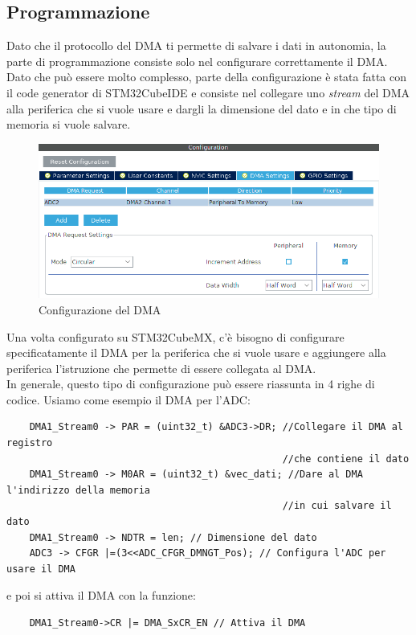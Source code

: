 \subsection{Programmazione}
Dato che il protocollo del DMA ti permette di salvare i dati in autonomia, la parte di programmazione consiste solo nel configurare correttamente il DMA.\\



Dato che può essere molto complesso, parte della configurazione è stata fatta con il code generator di STM32CubeIDE e consiste nel collegare uno \textit{stream} del DMA alla periferica che si vuole usare e dargli la dimensione del dato e in che tipo di memoria si vuole salvare.\\

\begin{figure}
    \centering
    \includegraphics[width=\linewidth]{microcontrollore/assets/dma_configuration.png}
    \caption{Configurazione del DMA}
    \label{fig:DMA}
\end{figure}

Una volta configurato su STM32CubeMX, c'è bisogno di configurare specificatamente il DMA per la periferica che si vuole usare e aggiungere alla periferica l'istruzione che permette di essere collegata al DMA.\\

In generale, questo tipo di configurazione può essere riassunta in 4 righe di codice. Usiamo come esempio il DMA per l'ADC:

\begin{verbatim}
    DMA1_Stream0 -> PAR = (uint32_t) &ADC3->DR; //Collegare il DMA al registro
                                                //che contiene il dato
    DMA1_Stream0 -> M0AR = (uint32_t) &vec_dati; //Dare al DMA l'indirizzo della memoria
                                                //in cui salvare il dato
    DMA1_Stream0 -> NDTR = len; // Dimensione del dato
    ADC3 -> CFGR |=(3<<ADC_CFGR_DMNGT_Pos); // Configura l'ADC per usare il DMA
\end{verbatim}

e poi si attiva il DMA con la funzione:

\begin{verbatim}
    DMA1_Stream0->CR |= DMA_SxCR_EN // Attiva il DMA
\end{verbatim}
